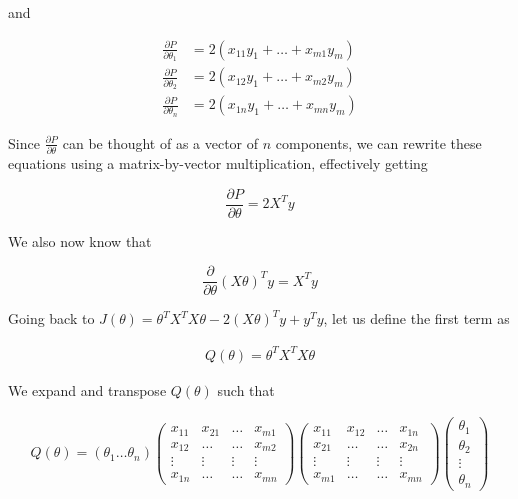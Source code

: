 \documentclass{article}
\begin{document}
        \noindent and

        \begin{align*}
            \frac{\partial P}{\partial \theta_1}    &= 2(x_{11}y_1+\dots+x_{m1}y_m) \\
            \frac{\partial P}{\partial \theta_2}    &= 2(x_{12}y_1+\dots+x_{m2}y_m) \\
            \frac{\partial P}{\partial \theta_n}    &= 2(x_{1n}y_1+\dots+x_{mn}y_m)
        \end{align*}

        \noindent Since $\frac{\partial P}{\partial\theta}$ can be thought of as a vector of $n$ components,
        we can rewrite these equations using a matrix-by-vector multiplication, effectively getting

        \begin{equation*}
            \frac{\partial P}{\partial\theta} = 2X^T y
        \end{equation*}

        \noindent We also now know that

        \begin{equation*}
            \frac{\partial}{\partial\theta} (X\theta)^T y = X^T y
        \end{equation*}

        \noindent Going back to $J(\theta) = \theta^T X^T X\theta-2(X\theta)^T y+y^T y$, let us define the
        first term as

        \begin{align*}
            Q(\theta) = \theta^T X^T X\theta
        \end{align*}

        \noindent We expand and transpose $Q(\theta)$ such that

        \begin{align*}
            Q(\theta) = (\theta_1\dots\theta_n)
            \begin{pmatrix}
                x_{11} & x_{21} & \dots & x_{m1} \\
                x_{12} & \dots  & \dots & x_{m2} \\
                \vdots & \vdots & \vdots & \vdots \\
                x_{1n} & \dots  & \dots & x_{mn}
            \end{pmatrix}
            \begin{pmatrix}
                x_{11} & x_{12} & \dots & x_{1n} \\
                x_{21} & \dots  & \dots & x_{2n} \\
                \vdots & \vdots & \vdots & \vdots \\
                x_{m1} & \dots  & \dots & x_{mn}
            \end{pmatrix}
            \begin{pmatrix}
                \theta_1 \\
                \theta_2 \\
                \vdots \\
                \theta_n
            \end{pmatrix}
        \end{align*}
\end{document}
